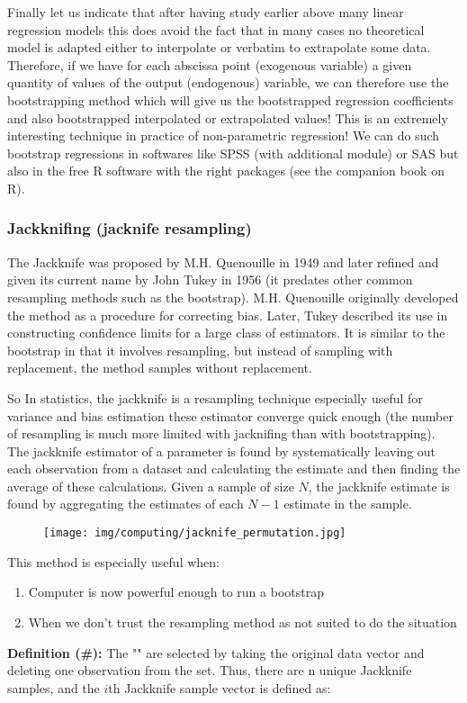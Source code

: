 	Finally let us indicate that after having study earlier above many linear regression models this does avoid the fact that in many cases no theoretical model is adapted either to interpolate or verbatim to extrapolate some data. Therefore, if we have for each abscissa point (exogenous variable) a given quantity of values  of the output (endogenous) variable, we can therefore use the bootstrapping method which will give us the bootstrapped regression coefficients and also bootstrapped interpolated or extrapolated values! This is an extremely interesting technique  in practice of non-parametric regression! We can do such bootstrap regressions in softwares like SPSS (with additional module) or SAS but also in the free R software with the right packages (see the companion book on R).
	
	\pagebreak
	\subsubsection{Jackknifing (jacknife resampling)}
	The Jackknife was proposed by M.H. Quenouille in 1949 and later refined and given its current name by John Tukey in 1956 (it predates other common resampling methods such as the bootstrap). M.H. Quenouille originally developed the method as a procedure for correcting bias. Later, Tukey described its use in constructing confidence limits for a large class of estimators. It is similar to the bootstrap in that it involves resampling, but instead of sampling with replacement, the method samples without replacement.

	So In statistics, the jackknife is a resampling technique especially useful for variance and bias estimation these estimator converge quick enough (the number of resampling is much more limited with jacknifing than with bootstrapping). The jackknife estimator of a parameter is found by systematically leaving out each observation from a dataset and calculating the estimate and then finding the average of these calculations. Given a sample of size $N$, the jackknife estimate is found by aggregating the estimates of each $N-1$ estimate in the sample.
	\begin{figure}[H]
		\centering
		\texttt{[image: img/computing/jacknife\_permutation.jpg]}
	\end{figure}
	This method is especially useful when:
	\begin{enumerate}
		\item Computer is now powerful enough to run a bootstrap
		\item When we don't trust the resampling method as not suited to do the situation
	\end{enumerate}
	\textbf{Definition (\#\mydef):} The "" are selected by taking the original data vector and deleting one observation from the set. Thus, there are n unique Jackknife samples, and the $i$th Jackknife sample vector is defined as:

